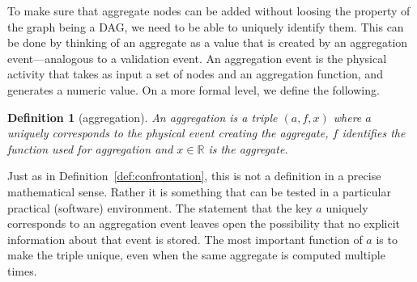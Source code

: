 \documentclass[a4paper, 11pt,titlepage]{article}
\newtheorem{definition}{Definition}
\begin{document}
To make sure that aggregate nodes can be added without loosing the property of
the graph being a DAG, we need to be able to uniquely identify them. This can
be done by thinking of an aggregate as a value that is created by an
aggregation event---analogous to a validation event. An aggregation event is
the physical activity that takes as input a set of nodes and an aggregation
function, and generates a numeric value. On a more formal level, we define the
following.
%
\begin{definition}[aggregation]
\label{def:aggregation}
An \emph{aggregation} is a triple $(a,f,x)$ where $a$ uniquely corresponds
to the physical event creating the aggregate, $f$ identifies the function used for
aggregation and $x\in \mathbb{R}$ is the aggregate.
\end{definition}
Just as in Definition~\ref{def:confrontation}, this is not a definition in a
precise mathematical sense. Rather it is something that can be tested in a
particular practical (software) environment. The statement that the key $a$
uniquely corresponds to an aggregation event leaves open the possibility that
no explicit information about that event is stored. The most important function
of $a$ is to make the triple unique, even when the same aggregate is computed
multiple times.
\end{document}
